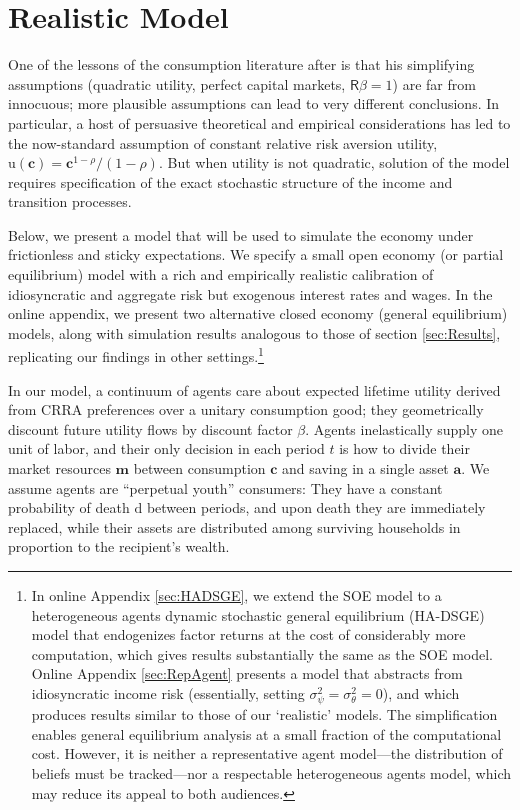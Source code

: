 \documentclass[titlepage]{article}
\begin{document}
\section{Realistic Model}
\label{sec:models}

One of the lessons of the consumption literature after \cite{hallRandomWalk} is that his simplifying assumptions (quadratic utility, perfect capital markets, $\mathsf{R}\beta=1$) are far from innocuous; more plausible assumptions can lead to very different conclusions.  In particular, a host of persuasive theoretical and empirical considerations has led to the now-standard assumption of constant relative risk aversion utility, ${\mathrm{u}}(\mathbf{c})=\mathbf{c}^{1-\rho}/(1-\rho).$ But when utility is not quadratic, solution of the model requires specification of the exact stochastic structure of the income and transition processes.

Below, we present a model that will be used to simulate the economy under frictionless and sticky expectations.  We specify a small open economy (or partial equilibrium) model with a rich and empirically realistic calibration of idiosyncratic and aggregate risk but exogenous interest rates and wages. In the online appendix, we present two alternative closed economy (general equilibrium) models, along with simulation results analogous to those of section \ref{sec:Results}, replicating our findings in other settings.\footnote{In online Appendix \ref{sec:HADSGE}, we extend the SOE model to a heterogeneous agents dynamic stochastic general equilibrium (HA-DSGE) model that endogenizes factor returns at the cost of considerably more computation, which gives results substantially the same as the SOE model.  Online Appendix \ref{sec:RepAgent} presents a model that abstracts from idiosyncratic income risk (essentially, setting $\sigma^{2}_{\psi}=\sigma^{2}_{\theta}=0$), and which produces results similar to those of our `realistic' models.  The simplification enables general equilibrium analysis at a small fraction of the computational cost. However, it is neither a representative agent model---the distribution of beliefs must be tracked---nor a respectable heterogeneous agents model, which may reduce its appeal to both audiences.}

In our model, a continuum of agents care about expected lifetime utility derived from CRRA preferences over a unitary consumption good; they geometrically discount future utility flows by discount factor $\beta$.  Agents inelastically supply one unit of labor, and their only decision in each period $t$ is how to divide their market resources $\mathbf{m}$ between consumption $\mathbf{c}$ and saving in a single asset $\mathbf{a}$.  We assume agents are \cite{blanchardFinite} ``perpetual youth'' consumers: They have a constant probability of death $\mathrm{d}$ between periods, and upon death they are immediately replaced, while their assets are distributed among surviving households in proportion to the recipient's wealth.
\end{document}
